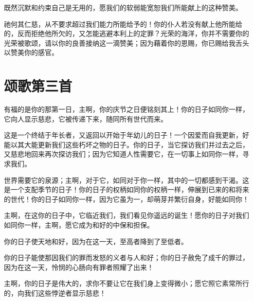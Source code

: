 既然沉默和约束自己是无用的，愿我们的软弱能宽恕我们所能献上的这种赞美。\par

祂何其仁慈，从不要求超过我们能力所能给予的！你的仆人若没有献上他所能给的，反而拒绝他所欠的，又怎能逃避本利上的定罪？光荣的海洋，你并不需要你的光荣被歌颂，请以你的良善接纳这一滴赞美；因为藉着你的恩赐，你已赐给我舌头以赞美你的感官。\par


\section{颂歌第三首}

有福的是你的那第一日，主啊，你的庆节之日便铭刻其上！你的日子如同你一样，它向人显示慈悲，它被传递下来，随同所有世代而来。\par

这是一个终结于年长者，又返回以开始于年幼儿的日子！一个因爱而自我更新，好能以其大能更新我们这些朽坏之物的日子。你的日子，当它探访我们并过去之后，又慈悲地回来再次探访我们；因为它知道人性需要它，在一切事上如同你一样，寻求我们。\par

世界需要它的泉源；主啊，对于它，如同对于你一样，其中的一切都感到干渴。这是一个支配季节的日子！你的日子的权柄如同你的权柄一样，伸展到已来的和将来的世代！你的日子如同你一样，因为它虽为一，却萌芽并繁衍自身，好能如同你！\par

主啊，在这你的日子中，它临近我们，我们看见你遥远的诞生！愿你的日子对我们如同你一样，主啊，愿它成为和好的中保和担保。\par

你的日子使天地和好，因为在这一天，至高者降到了至低者。\par

你的日子能使那因我们的罪而发怒的义者与人和好；你的日子赦免了成千的罪过，因为在这一天，怜悯的心肠向有罪者照耀了出来！\par

主啊，你的日子是伟大的，求你不要让它在我们身上变得微小；愿它照它素常所行的，向我们这些悖逆者显示慈悲！\par

